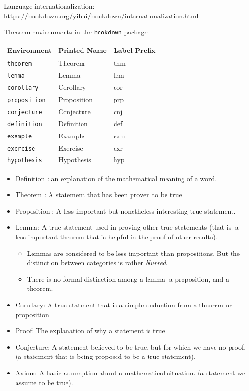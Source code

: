 \documentclass[
]{book}
\providecommand{\tightlist}{%
  \setlength{\itemsep}{0pt}\setlength{\parskip}{0pt}}
\theoremstyle{definition}
\theoremstyle{definition}
\theoremstyle{definition}
\theoremstyle{definition}
\theoremstyle{remark}
\begin{document}
Language internationalization: \url{https://bookdown.org/yihui/bookdown/internationalization.html}

Theorem environments in the \href{https://bookdown.org/yihui/bookdown/markdown-extensions-by-bookdown.html\#tab:theorem-envs}{\texttt{bookdown} package}.

\begin{longtable}[]{@{}lll@{}}
\toprule\noalign{}
Environment & Printed Name & Label Prefix \\
\midrule\noalign{}
\endhead
\bottomrule\noalign{}
\endlastfoot
\texttt{theorem} & Theorem & thm \\
\texttt{lemma} & Lemma & lem \\
\texttt{corollary} & Corollary & cor \\
\texttt{proposition} & Proposition & prp \\
\texttt{conjecture} & Conjecture & cnj \\
\texttt{definition} & Definition & def \\
\texttt{example} & Example & exm \\
\texttt{exercise} & Exercise & exr \\
\texttt{hypothesis} & Hypothesis & hyp \\
\end{longtable}

\begin{itemize}
\tightlist
\item
  Definition : an explanation of the mathematical meaning of a word.
\item
  Theorem : A statement that has been proven to be true.
\item
  Proposition : A less important but nonetheless interesting true statement.
\item
  Lemma: A true statement used in proving other true statements (that is, a less important theorem that is helpful in the proof of other results).

  \begin{itemize}
  \tightlist
  \item
    Lemmas are considered to be less important than propositions. But the distinction between categories is rather \emph{blurred}.
  \item
    There is no formal distinction among a lemma, a proposition, and a theorem.
  \end{itemize}
\item
  Corollary: A true statment that is a simple deduction from a theorem or proposition.
\item
  Proof: The explanation of why a statement is true.
\item
  Conjecture: A statement believed to be true, but for which we have no proof. (a statement that is being proposed to be a true statement).
\item
  Axiom: A basic assumption about a mathematical situation. (a statement we assume to be true).
\end{itemize}
\end{document}
